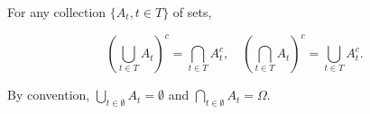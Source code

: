 For any collection $\{A_t, t \in T\}$ of sets,

$$\left(\bigcup_{t \in T} A_t\right)^c = \bigcap_{t \in T} A_t^c, \quad \left(\bigcap_{t \in T} A_t\right)^c = \bigcup_{t \in T} A_t^c.$$

By convention, $\bigcup_{t \in \emptyset} A_t = \emptyset$ and $\bigcap_{t \in \emptyset} A_t = \Omega$.
